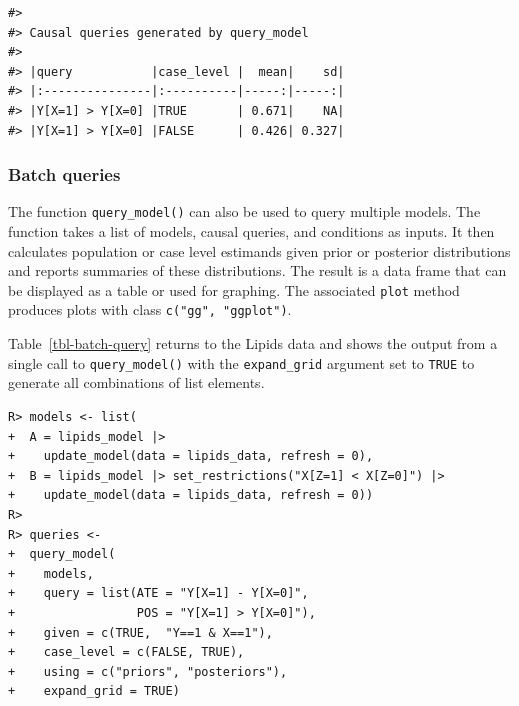\documentclass[
  11pt,
  article]{jss}
\begin{document}
\begin{verbatim}
#> 
#> Causal queries generated by query_model
#> 
#> |query           |case_level |  mean|    sd|
#> |:---------------|:----------|-----:|-----:|
#> |Y[X=1] > Y[X=0] |TRUE       | 0.671|    NA|
#> |Y[X=1] > Y[X=0] |FALSE      | 0.426| 0.327|
\end{verbatim}

\subsubsection{Batch queries}\label{batch-queries}

The function \texttt{query\_model()} can also be used to query multiple
models. The function takes a list of models, causal queries, and
conditions as inputs. It then calculates population or case level
estimands given prior or posterior distributions and reports summaries
of these distributions. The result is a data frame that can be displayed
as a table or used for graphing. The associated \texttt{plot} method
produces plots with class \texttt{c("gg",\ "ggplot")}.

Table~\ref{tbl-batch-query} returns to the Lipids data and shows the
output from a single call to \texttt{query\_model()} with the
\texttt{expand\_grid} argument set to \texttt{TRUE} to generate all
combinations of list elements.

\begin{verbatim}
R> models <- list(
+  A = lipids_model |> 
+    update_model(data = lipids_data, refresh = 0),
+  B = lipids_model |> set_restrictions("X[Z=1] < X[Z=0]") |>
+    update_model(data = lipids_data, refresh = 0))
R> 
R> queries <- 
+  query_model(
+    models,  
+    query = list(ATE = "Y[X=1] - Y[X=0]", 
+                 POS = "Y[X=1] > Y[X=0]"),
+    given = c(TRUE,  "Y==1 & X==1"),
+    case_level = c(FALSE, TRUE),
+    using = c("priors", "posteriors"),
+    expand_grid = TRUE)
\end{verbatim}
\end{document}
